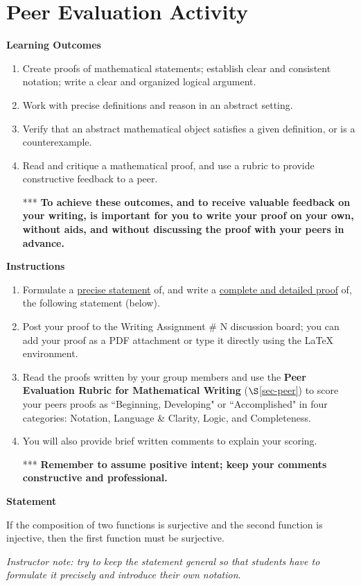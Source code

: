 \section{Peer Evaluation Activity}
\textbf{Learning Outcomes}
\begin{enumerate}
	\item Create proofs of mathematical statements; establish clear and consistent notation; write a clear and organized logical argument. 
	\item Work with precise definitions and reason in an abstract setting.
	\item Verify that an abstract mathematical object satisfies a given definition, or is a counterexample. 
	\item Read and critique a mathematical proof, and use a rubric to provide constructive feedback to a peer.
	\item[***] \textbf{To achieve these outcomes, and to receive valuable feedback on your writing, is important for you to write your proof on your own, without aids, and without discussing the proof with your peers in advance.} 
\end{enumerate}

\noindent\textbf{Instructions}
\begin{enumerate}
	\item Formulate a \underline{precise statement} of, and write a \underline{complete and detailed proof} of, the following statement (below).
	\item Post your proof to the Writing Assignment \# N discussion board; you can add your proof as a PDF attachment or type it directly using the \LaTeX\, environment.
	\item Read the proofs written by your group members and use the \textbf{Peer Evaluation Rubric for Mathematical Writing} ($\S$\ref{sec-peer}) to score your peers proofs as ``Beginning, Developing" or ``Accomplished" in four categories: Notation, Language \& Clarity, Logic, and Completeness.
	\item You will also provide brief written comments to explain your scoring.
	\item[***] \textbf{Remember to assume positive intent; keep your comments constructive and professional.}  
\end{enumerate}

\noindent\textbf{Statement}

If the composition of two functions is surjective and the second function is injective, then the first function must be surjective.

\noindent\emph{Instructor note: try to keep the statement general so that students have to formulate it precisely and introduce their own notation}.

